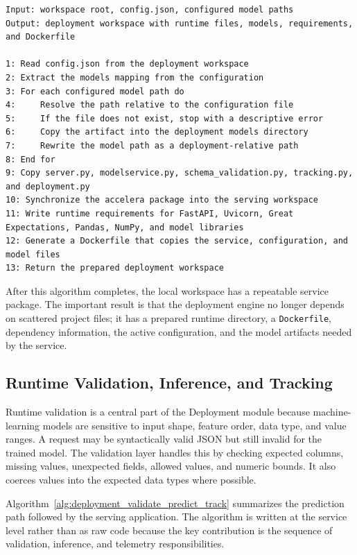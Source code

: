 \begin{lstlisting}[style=algostyle,caption={Preparing deployment artifacts},label={alg:deployment_prepare_artifacts}]
Input: workspace root, config.json, configured model paths
Output: deployment workspace with runtime files, models, requirements, and Dockerfile

1: Read config.json from the deployment workspace
2: Extract the models mapping from the configuration
3: For each configured model path do
4:     Resolve the path relative to the configuration file
5:     If the file does not exist, stop with a descriptive error
6:     Copy the artifact into the deployment models directory
7:     Rewrite the model path as a deployment-relative path
8: End for
9: Copy server.py, modelservice.py, schema_validation.py, tracking.py, and deployment.py
10: Synchronize the accelera package into the serving workspace
11: Write runtime requirements for FastAPI, Uvicorn, Great Expectations, Pandas, NumPy, and model libraries
12: Generate a Dockerfile that copies the service, configuration, and model files
13: Return the prepared deployment workspace
\end{lstlisting}

After this algorithm completes, the local workspace has a repeatable service
package. The important result is that the deployment engine no longer depends
on scattered project files; it has a prepared runtime directory, a
\texttt{Dockerfile}, dependency information, the active configuration, and the
model artifacts needed by the service.

\subsection{Runtime Validation, Inference, and Tracking}
\noindent Runtime validation is a central part of the Deployment module because
machine-learning models are sensitive to input shape, feature order, data type,
and value ranges. A request may be syntactically valid JSON but still invalid
for the trained model. The validation layer handles this by checking expected
columns, missing values, unexpected fields, allowed values, and numeric bounds.
It also coerces values into the expected data types where possible.

Algorithm~\ref{alg:deployment_validate_predict_track} summarizes the prediction
path followed by the serving application. The algorithm is written at the
service level rather than as raw code because the key contribution is the
sequence of validation, inference, and telemetry responsibilities.

